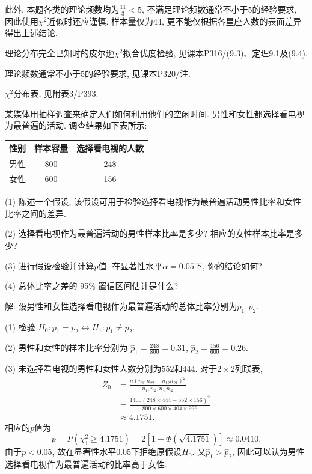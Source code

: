 \documentclass[standard]{ExBook}
\renewenvironment{shaded}{%
  \def\FrameCommand{\fboxsep=\FrameSep \colorbox{shadecolor}}%
  \MakeFramed{\advance\hsize-\width \FrameRestore}%
}{%
  \endMakeFramed
}
\begin{document}
\begin{qitems}
此外, 本题各类的理论频数均为$\frac{11}{3}<5$, 不满足理论频数通常不小于$5$的经验要求, 因此使用$\chi^2$近似时还应谨慎. 样本量仅为$44$, 更不能仅根据各星座人数的表面差异得出上述结论.

\textcolor{themeColor}{\selectfont {} 理论分布完全已知时的皮尔逊$\chi^2$拟合优度检验, 见课本P316/(9.3)、定理9.1及(9.4).}

\textcolor{themeColor}{\selectfont {} 理论频数通常不小于$5$的经验要求, 见课本P320/注.}

\textcolor{themeColor}{\selectfont {} $\chi^2$分布表, 见附表3/P393.}

\vspace{2.5cm-5em}

    \begin{bbox}
    \begin{shaded}
        \qitem
某媒体用抽样调查来确定人们如何利用他们的空闲时间. 男性和女性都选择看电视为最普遍的活动. 调查结果如下表所示:
\begin{center}
\setlength{\tabcolsep}{51pt}
\begin{tabular}{c|c|c}
\hline
性别 & 样本容量 & 选择看电视的人数 \\
\hline
男性 & 800 & 248 \\
女性 & 600 & 156 \\
\hline
\end{tabular}
\end{center}
(1) 陈述一个假设, 该假设可用于检验选择看电视作为最普遍活动男性比率和女性比率之间的差异.

(2) 选择看电视作为最普遍活动的男性样本比率是多少? 相应的女性样本比率是多少?

(3) 进行假设检验并计算$p$值. 在显著性水平$\alpha=0.05$下, 你的结论如何?

(4) 总体比率之差的 95\% 置信区间估计是什么?
    \end{shaded}
    \end{bbox}

\vspace{\dimexpr2.5cm-5em\relax}

解: 设男性和女性选择看电视作为最普遍活动的总体比率分别为$p_1,p_2$.

(1) 检验
$
H_0:p_1=p_2
\leftrightarrow
H_1:p_1\neq p_2
$.

(2) 男性和女性的样本比率分别为
$\hat{p}_1=\frac{248}{800}=0.31$, 
$\hat{p}_2=\frac{156}{600}=0.26$.

(3) 未选择看电视的男性和女性人数分别为$552$和$444$. 对于$2\times2$列联表,
$$
\begin{aligned}
Z_0
&=\frac{n(n_{11}n_{22}-n_{12}n_{21})^2}
{n_{1\cdot}n_{2\cdot}n_{\cdot1}n_{\cdot2}}\\
&=\frac{1400(248\times444-552\times156)^2}
{800\times600\times404\times996}\\
&\approx4.1751.
\end{aligned}
$$
相应的$p$值为
$$
p
=P(\chi_1^2\geq4.1751)
=2\left[1-\Phi\left(\sqrt{4.1751}\right)\right]
\approx0.0410.
$$
由于$p<0.05$, 故在显著性水平$0.05$下拒绝原假设$H_0$. 又$\hat{p}_1>\hat{p}_2$, 因此可以认为男性选择看电视作为最普遍活动的比率高于女性.


\end{qitems}
\end{document}
